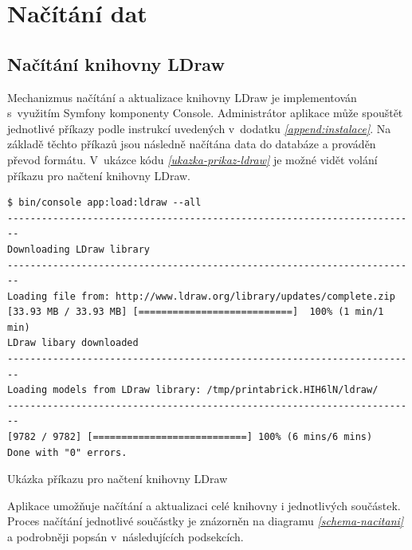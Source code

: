 \section{Načítání dat}

\subsection{Načítání knihovny LDraw}
Mechanizmus načítání a aktualizace knihovny LDraw je implementován s~využitím Symfony komponenty Console. Administrátor aplikace může spouštět jednotlivé příkazy podle instrukcí uvedených v~dodatku \emph{\ref{append:instalace}}. Na základě těchto příkazů jsou následně načítána data do databáze a prováděn převod formátu. V~ukázce kódu \emph{\ref{ukazka-prikaz-ldraw}} je možné vidět volání příkazu pro načtení knihovny LDraw.

\begin{listing}[htbp]
        \begin{verbatim}
$ bin/console app:load:ldraw --all
------------------------------------------------------------------------
Downloading LDraw library
------------------------------------------------------------------------
Loading file from: http://www.ldraw.org/library/updates/complete.zip
[33.93 MB / 33.93 MB] [===========================]  100% (1 min/1 min)
LDraw libary downloaded
------------------------------------------------------------------------
Loading models from LDraw library: /tmp/printabrick.HIH6lN/ldraw/
------------------------------------------------------------------------
[9782 / 9782] [===========================] 100% (6 mins/6 mins) 
Done with "0" errors.
        \end{verbatim}
    \caption{Ukázka příkazu pro načtení knihovny LDraw\label{ukazka-prikaz-ldraw}}
\end{listing}

Aplikace umožňuje načítání a aktualizaci celé knihovny i jednotlivých součástek. Proces načítání jednotlivé součástky je znázorněn na diagramu \emph{\ref{schema-nacitani}} a podrobněji popsán v~následujících podsekcích.

